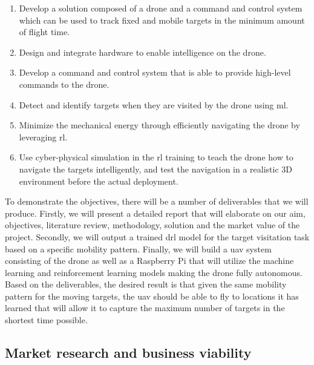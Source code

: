 \documentclass[../main.tex]{subfiles}
\begin{document}
\begin{enumerate}
    \item \label{obj:overview}
        Develop a solution composed of a drone and
        a command and control system which can be used
        to track fixed and mobile targets in the
        minimum amount of flight time.
    \item \label{obj:hardware} Design and integrate 
        hardware to enable 
        intelligence on the drone.
    \item Develop a command and control system that
        is able to provide high-level commands 
        to the drone.
    \item \label{obj:machine-learning} 
        Detect and identify
        targets when they are visited by the drone
        using \gls{ml}.
    \item \label{obj:drl} 
        Minimize the mechanical energy through efficiently
        navigating the drone by leveraging \gls{rl}.
    \item \label{obj:simulation} 
        Use cyber-physical simulation in the \gls{rl} training
        to teach the drone how to navigate the targets
        intelligently, and test the navigation in a realistic
        3D environment before the actual deployment.
\end{enumerate}

To demonstrate the objectives, there will be a number 
of deliverables that we will produce.
Firstly, we will present a detailed report 
that will elaborate on our aim, objectives, 
literature review, methodology,
solution and the market value of the project.
Secondly, we will output a trained \gls{drl} model for 
the target visitation task based on a specific
mobility pattern.
Finally, we will build a \gls{uav} system
consisting of the \anafi drone as well as a Raspberry Pi
that will utilize the machine learning and reinforcement learning
models making the \anafi drone fully autonomous.
Based on the deliverables, the desired result is that
given the same mobility pattern for 
the moving targets,
the \gls{uav} should be able to fly to locations it has learned
that will allow it to capture the maximum number of targets in the
shortest time possible. 

\subsection{Market research and business viability}


\end{document}
